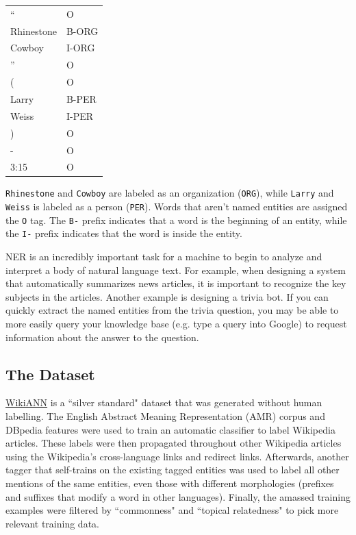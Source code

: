 \documentclass[11pt,addpoints,answers]{exam}
\begin{document}
\begin{tabular}{ m{3cm}  m{3cm} } 
    `` & O \\
    Rhinestone & B-ORG \\
    Cowboy & I-ORG \\
    '' & O \\
    ( & O \\
    Larry & B-PER \\
    Weiss & I-PER \\
    ) & O \\ 
    - & O \\
    3:15 & O
\end{tabular}

 \texttt{Rhinestone} and \texttt{Cowboy} are labeled as an organization (\texttt{ORG}), while \texttt{Larry} and \texttt{Weiss} is labeled as a person (\texttt{PER}). Words that aren't named entities are assigned the \texttt{O} tag. The \texttt{B-} prefix indicates that a word is the beginning of an entity, while the \texttt{I-} prefix indicates that the word is inside the entity.

NER is an incredibly important task for a machine to begin to analyze and interpret a body of natural language text. For example, when designing a system that automatically summarizes news articles, it is important to recognize the key subjects in the articles. Another example is designing a trivia bot. If you can quickly extract the named entities from the trivia question, you may be able to more easily query your knowledge base (e.g. type a query into Google) to request information about the answer to the question.

\subsection{The Dataset}\label{dataset}
\href{https://aclanthology.org/P17-1178.pdf}{WikiANN} is a ``silver standard" dataset that was generated without human labelling. The English Abstract Meaning Representation (AMR) corpus and DBpedia features were used to train an automatic classifier to label Wikipedia articles. These labels were then propagated throughout other Wikipedia articles using the Wikipedia's cross-language links and redirect links. Afterwards, another tagger that self-trains on the existing tagged entities was used to label all other mentions of the same entities, even those with different morphologies (prefixes and suffixes that modify a word in other languages). Finally, the amassed training examples were filtered by ``commonness" and ``topical relatedness" to pick more relevant training data. 
\end{document}
